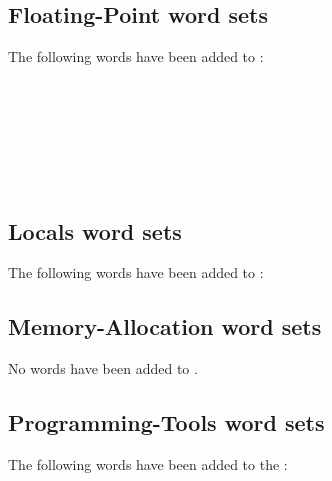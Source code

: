 \begin{minipage}[t]{0.3\linewidth}
\end{minipage}
\hfill
\begin{minipage}[t]{0.3\linewidth}
\end{minipage}
\hfill
\begin{minipage}[t]{0.3\linewidth}
\end{minipage}

\subsection{Floating-Point word sets}
The following words have been added to :

\begin{minipage}[t]{0.3\linewidth}
	 \\
	 \\
\end{minipage}
\hfill
\begin{minipage}[t]{0.3\linewidth}
	 \\
\end{minipage}
\hfill
\begin{minipage}[t]{0.3\linewidth}
	 \\
\end{minipage}

\subsection{Locals word sets}
The following words have been added to :


\subsection{Memory-Allocation word sets}
No words have been added to .

\subsection{Programming-Tools word sets}
\label{diff:12:tools}
The following words have been added to the :


